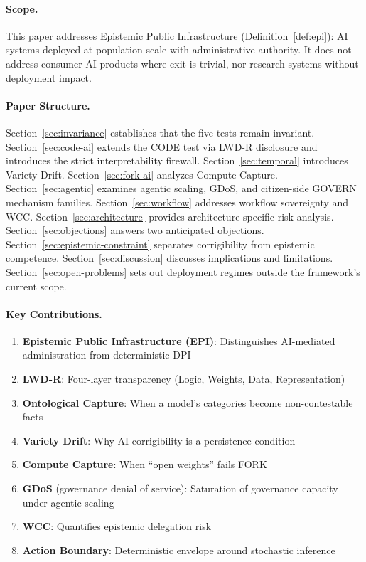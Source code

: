 \documentclass{article}
\theoremstyle{definition}
\begin{document}
\paragraph{Scope.} This paper addresses Epistemic Public Infrastructure (Definition~\ref{def:epi}): AI systems deployed at population scale with administrative authority. It does not address consumer AI products where exit is trivial, nor research systems without deployment impact.

\paragraph{Paper Structure.} Section~\ref{sec:invariance} establishes that the five tests remain invariant. Section~\ref{sec:code-ai} extends the CODE test via LWD-R disclosure and introduces the strict interpretability firewall. Section~\ref{sec:temporal} introduces Variety Drift. Section~\ref{sec:fork-ai} analyzes Compute Capture. Section~\ref{sec:agentic} examines agentic scaling, GDoS, and citizen-side GOVERN mechanism families. Section~\ref{sec:workflow} addresses workflow sovereignty and WCC. Section~\ref{sec:architecture} provides architecture-specific risk analysis. Section~\ref{sec:objections} answers two anticipated objections. Section~\ref{sec:epistemic-constraint} separates corrigibility from epistemic competence. Section~\ref{sec:discussion} discusses implications and limitations. Section~\ref{sec:open-problems} sets out deployment regimes outside the framework's current scope.

\paragraph{Key Contributions.}
\begin{enumerate}[noitemsep]
    \item \textbf{Epistemic Public Infrastructure (EPI)}: Distinguishes AI-mediated administration from deterministic DPI
    \item \textbf{LWD-R}: Four-layer transparency (Logic, Weights, Data, Representation)
    \item \textbf{Ontological Capture}: When a model's categories become non-contestable facts
    \item \textbf{Variety Drift}: Why AI corrigibility is a persistence condition
    \item \textbf{Compute Capture}: When ``open weights'' fails FORK
    \item \textbf{GDoS} (governance denial of service): Saturation of governance capacity under agentic scaling
    \item \textbf{WCC}: Quantifies epistemic delegation risk
    \item \textbf{Action Boundary}: Deterministic envelope around stochastic inference
\end{enumerate}
\end{document}

